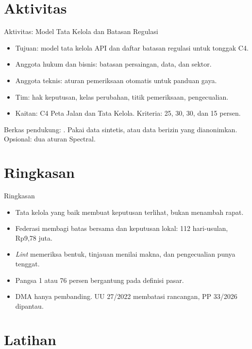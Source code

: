 \documentclass[aspectratio=169, table, 12pt]{beamer}
\begin{document}
\section{Aktivitas}

\begin{frame}{{\Large Aktivitas: Model Tata Kelola dan Batasan Regulasi}}
  \vspace{4pt}
  \begin{itemize}
    \item Tujuan: model tata kelola API dan daftar batasan regulasi untuk tonggak C4.
    \item Anggota hukum dan bisnis: batasan persaingan, data, dan sektor.
    \item Anggota teknis: aturan pemeriksaan otomatis untuk panduan gaya.
    \item Tim: hak keputusan, kelas perubahan, titik pemeriksaan, pengecualian.
    \item Kaitan: C4 Peta Jalan dan Tata Kelola. Kriteria: 25, 30, 30, dan 15 persen.
  \end{itemize}
  \vspace{4pt}
  {\footnotesize Berkas pendukung: . Pakai data sintetis, atau data berizin yang dianonimkan. Opsional: dua aturan Spectral.}
\end{frame}

\section{Ringkasan}

\begin{frame}{{\Large Ringkasan}}
  \vspace{4pt}
  \begin{itemize}
    \item Tata kelola yang baik membuat keputusan terlihat, bukan menambah rapat.
    \item Federasi membagi batas bersama dan keputusan lokal: 112 hari-usulan, Rp9,78 juta.
    \item \textit{Lint} memeriksa bentuk, tinjauan menilai makna, dan pengecualian punya tenggat.
    \item Pangsa 1 atau 76 persen bergantung pada definisi pasar.
    \item DMA hanya pembanding. UU 27/2022 membatasi rancangan, PP 33/2026 dipantau.
  \end{itemize}
\end{frame}

\section{Latihan}
\end{document}
